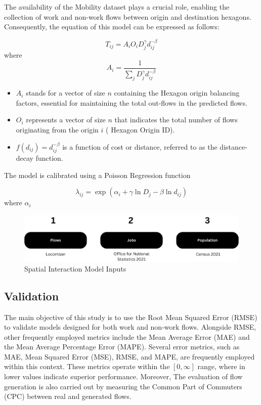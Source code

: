 The availability of the Mobility dataset plays a crucial role, enabling the collection of work and non-work flows between origin and destination hexagons. Consequently, the equation of this model can be expressed as follows:

\begin{equation} \label{eq:1} \tag{1}
T_{ij} = A_i O_i D_j^\gamma d_{ij}^{-\beta}
\end{equation}
where
\begin{equation} \label{eq:3} \tag{2}
A_i = \frac{1}{\sum_j D_j^\gamma d_{ij}^{-\beta}}
\end{equation}

\begin{itemize}
    \item $A_i$ stands for a vector of size $n$ containing the Hexagon origin balancing factors, essential for maintaining the total out-flows in the predicted flows.
    \item $O_i$  represents a vector of size $n$ that indicates the total number of flows originating from the origin $i$ ( Hexagon Origin ID).
    \item $f(d_{ij})=d_{ij}^{-\beta}$  is a function of cost or distance, referred to as the distance-decay function.
\end{itemize}

The model is calibrated using a Poisson Regression function

\begin{equation} \label{eq:4} \tag{4}
\lambda_{ij} = \exp (\alpha_i + \gamma \ln D_j - \beta \ln d_{ij})
\end{equation}
where $\alpha_i$

\begin{figure}[H]
        \centering
        \includegraphics[width=14cm]{Images/SIM_fig.png}
        \caption{Spatial Interaction Model Inputs}
        \label{fig: SIM_input}
    \end{figure}


\subsection{Validation}

The main objective of this study is to use the Root Mean Squared Error (RMSE) to validate models designed for both work and non-work flows. Alongside RMSE, other frequently employed metrics include the Mean Average Error (MAE) and the Mean Average Percentage Error (MAPE). Several error metrics, such as MAE, Mean Squared Error (MSE), RMSE, and MAPE, are frequently employed within this context. These metrics operate within the $[0, \infty ]$ range, where in lower values indicate superior performance. Moreover, The evaluation of flow generation is also carried out by measuring the Common Part of Commuters (CPC) between real and generated flows\citep{lucaSurveyDeepLearning2021}.

